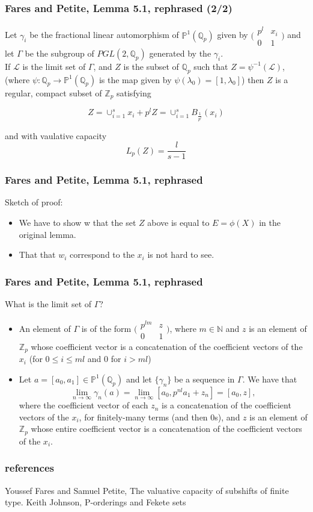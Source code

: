 \documentclass{beamer}
\theoremstyle{definition}
\begin{document}
\begin{frame}
\frametitle{Fares and Petite, Lemma 5.1, rephrased (2/2)}
 Let $\gamma_i$ be the fractional linear automorphism of $\mathbb{P}^{1}(\mathbb{Q}_p)$ given by $\bigl( \begin{smallmatrix}p^l & x_i\\ 0 & 1 \end{smallmatrix}\bigr)$ and let $\Gamma$ be the subgroup of $PGL(2,\mathbb{Q}_p)$ generated by the $\gamma_i$.\\
If $\mathcal{L}$ is the limit set of $\Gamma$, and $Z$ is the subset of $\mathbb{Q}_p$ such that $Z = \psi^{-1}(\mathcal{L})$, (where $\psi: \mathbb{Q}_p \rightarrow \mathbb{P}^1(\mathbb{Q}_p)$ is the map given by $\psi(\lambda_0) = [1, \lambda_0]$) then $Z$ is a regular, compact subset of $\mathbb{Z}_p$ satisfying

$$ Z= \cup_{i=1}^s x_i + p^lZ =\cup_{i=1}^s B_{\frac{1}{p^l}}(x_i)$$

and with vaulative capacity \[L_p(Z) = \frac{l}{s-1}\]

\end{frame}

\begin{frame}
\frametitle{Fares and Petite, Lemma 5.1, rephrased}
Sketch of proof:
\begin{itemize}
\item We have to show w that the set $Z$ above is equal to $E=\phi(X)$ in the original lemma.
\item That that $w_i$ correspond to the $x_i$ is not hard to see.
\end{itemize}
\end{frame}

\begin{frame}
\frametitle{Fares and Petite, Lemma 5.1, rephrased}
What is the limit set of $\Gamma$?
\begin{itemize}
\item An element of $\Gamma$ is of the form $\bigl( \begin{smallmatrix}p^{lm} & z\\ 0 & 1 \end{smallmatrix}\bigr)$, where $m \in \mathbb{N}$ and $z$ is an element of $\mathbb{Z}_p$ whose coefficient vector is a concatenation of the coefficient vectors of the $x_i$ (for $0 \leq i \leq ml$ and $0$ for $i > ml$)
\item  Let $a=[a_0,a_1] \in \mathbb{P}^1(\mathbb{Q}_p)$ and let $\{\gamma_n\}$ be a sequence in $\Gamma$. We have that $$\lim_{n\to\infty} \gamma_n(a) = \lim_{n\to\infty} [a_0, p^{nl}a_1 + z_n] = [a_0, z],$$ where the coefficient vector of each $z_n$ is a concatenation of the coefficient vectors of the $x_i$, for finitely-many terms (and then $0$s), and $z$ is an element of $\mathbb{Z}_p$ whose entire coefficient vector is a concatenation of the coefficient vectors of the $x_i$.

\end{itemize}

\end{frame}


\begin{frame}
\frametitle{references}
\begin{thebibliography}{1}
 Youssef Fares and Samuel Petite, The valuative capacity of subshifts of finite type.
 Keith Johnson, P-orderings and Fekete sets
\end{thebibliography}
\end{frame}
\end{document}
